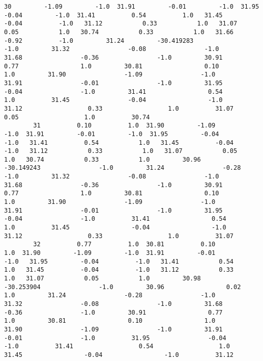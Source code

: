 \documentclass[11pt]{article}
\begin{document}
\begin{Verbatim}[commandchars=\\\{\}]
        30         -1.09         -1.0  31.91         -0.01         -1.0  31.95         -0.04         -1.0  31.41          0.54          1.0   31.45         -0.04          -1.0   31.12           0.33           1.0   31.07           0.05           1.0   30.74           0.33           1.0   31.66          -0.92          -1.0         31.24         -30.419283                -1.0         31.32                -0.08                -1.0         31.68                -0.36                -1.0         30.91                 0.77                 1.0         30.81                 0.10                 1.0         31.90                -1.09                -1.0         31.91                -0.01                -1.0         31.95                -0.04                -1.0         31.41                 0.54                 1.0          31.45                -0.04                 -1.0          31.12                  0.33                  1.0          31.07                  0.05                  1.0          30.74   
        31          0.10          1.0  31.90         -1.09         -1.0  31.91         -0.01         -1.0  31.95         -0.04         -1.0   31.41          0.54           1.0   31.45          -0.04          -1.0   31.12           0.33           1.0   31.07           0.05           1.0   30.74           0.33           1.0         30.96         -30.149243                -1.0         31.24                -0.28                -1.0         31.32                -0.08                -1.0         31.68                -0.36                -1.0         30.91                 0.77                 1.0         30.81                 0.10                 1.0         31.90                -1.09                -1.0         31.91                -0.01                -1.0         31.95                -0.04                -1.0          31.41                 0.54                  1.0          31.45                 -0.04                 -1.0          31.12                  0.33                  1.0          31.07   
        32          0.77          1.0  30.81          0.10          1.0  31.90         -1.09         -1.0  31.91         -0.01         -1.0   31.95         -0.04          -1.0   31.41           0.54           1.0   31.45          -0.04          -1.0   31.12           0.33           1.0   31.07           0.05           1.0         30.98         -30.253904                -1.0         30.96                 0.02                 1.0         31.24                -0.28                -1.0         31.32                -0.08                -1.0         31.68                -0.36                -1.0         30.91                 0.77                 1.0         30.81                 0.10                 1.0         31.90                -1.09                -1.0         31.91                -0.01                -1.0          31.95                -0.04                 -1.0          31.41                  0.54                  1.0          31.45                 -0.04                 -1.0          31.12   

\end{Verbatim}
\end{document}
